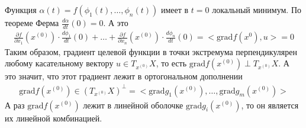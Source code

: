 \documentclass{article}
\begin{document}
Функция $\alpha(t)=f(\phi_1(t),\dotsc,\phi_n(t))$ имеет в $t=0$ локальный минимум. По теореме Ферма $\frac{d \alpha}{dt}(0) = 0$. А это
\begin{gather*}
    \frac{\partial f}{\partial x_1}(x^{(0)})\cdot \frac{d \phi_1}{dt}(0)+
    \dotsc + \frac{\partial f}{\partial x_n}(x^{(0)})\cdot \frac{d \phi_n}{dt}(0) = <\mathrm{grad}f(x^{0}),u> = 0
\end{gather*}
Таким образом, градиент целевой функции в точки экстремума перпендикулярен любому касательному вектору $u \in T_{x^{(0)}}X$, то есть $\mathrm{grad}f(x^{(0)}) \perp T_{x^{(0)}}X$. А это значит, что этот градиент лежит в ортогональном дополнении
\begin{gather*}
    \mathrm{grad}f(x^{(0)}) \in (T_{x^{(0)}}X)^\perp = <\mathrm{grad}g_1(x^{(0)}),\dotsc,\mathrm{grad}g_m(x^{(0)})>
\end{gather*}
А раз $\mathrm{grad}f(x^{(0)})$ лежит в линейной оболочке $\mathrm{grad}g_i(x^{(0)})$, то он является их линейной комбинацией.
	
\end{document}
